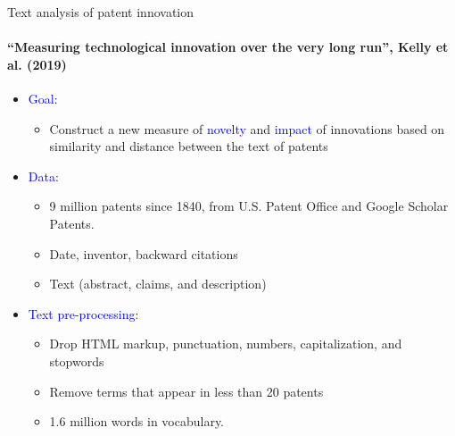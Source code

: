 \documentclass[english]{beamer}
\begin{document}
\begin{frame}{Text analysis of patent innovation}

\framesubtitle{``Measuring technological innovation over the very long run'',
Kelly et al. (2019)}

\begin{itemize}
\setlength{\itemsep}{1em}

\item \textcolor{blue}{Goal}:
\vspace{5pt}
\begin{itemize}
\setlength{\itemsep}{0.4em}
\item Construct a new measure of \textcolor{blue}{novelty} and \textcolor{blue}{impact} of innovations based on similarity and distance between the text of patents

\pause{}

\end{itemize}


\item \textcolor{blue}{Data}:
\vspace{5pt}
\begin{itemize}
\setlength{\itemsep}{0.4em}
\item 9 million patents since 1840, from U.S. Patent Office and Google Scholar
Patents.
\item Date, inventor, backward citations
\item Text (abstract, claims, and description)

\pause{}

\end{itemize}

\item \textcolor{blue}{Text pre-processing}:
\vspace{5pt}
\begin{itemize}
\setlength{\itemsep}{0.5em}

\item Drop HTML markup, punctuation, numbers, capitalization, and stopwords
\item Remove terms that appear in less than 20 patents
\item 1.6 million words in vocabulary.
\end{itemize}
\end{itemize}
\end{frame}
\end{document}
